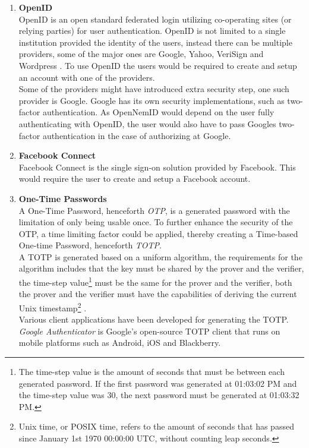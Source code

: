 \documentclass[twosided]{report}
\begin{document}
\begin{enumerate}
	\item[] \textbf{OpenID}\\
		OpenID is an open standard federated login utilizing co-operating sites (or relying parties) for user authentication. OpenID is not limited to a single institution provided the identity of the users, instead there can be multiple providers, some of the major ones are Google, Yahoo, VeriSign and Wordpress \cite{openid}. To use OpenID the users would be required to create and setup an account with one of the providers.\\
		Some of the providers might have introduced extra security step, one such provider is Google. Google has its own security implementations, such as two-factor authentication. As OpenNemID would depend on the user fully authenticating with OpenID, the user would also have to pass Googles two-factor authentication in the case of authorizing at Google.
	\item[] \textbf{Facebook Connect}\\
		Facebook Connect is the single sign-on solution provided by Facebook. This would require the user to create and setup a Facebook account. 
	\item[] \textbf{One-Time Passwords}\\
		A One-Time Password, henceforth \emph{OTP}, is a generated password with the limitation of only being usable once. To further enhance the security of the OTP, a time limiting factor could be applied, thereby creating a Time-based One-time Password, henceforth \emph{TOTP}.\\
		A TOTP is generated based on a uniform algorithm, the requirements for the algorithm includes that the key must be shared by the prover and the verifier, the time-step value\footnote{The time-step value is the amount of seconds that must be between each generated password. If the first password was generated at 01:03:02 PM and the time-step value was 30, the next password must be generated at 01:03:32 PM.} must be the same for the prover and the verifier, both the prover and the verifier must have the capabilities of deriving the current Unix timestamp\footnote{Unix time, or POSIX time, refers to the amount of seconds that has passed since January 1st 1970 00:00:00 UTC, without counting leap seconds.} \cite{rfc6238}.\\
		Various client applications have been developed for generating the TOTP. \emph{Google Authenticator} is Google's open-source TOTP client that runs on mobile platforms such as Android, iOS and Blackberry.

\end{enumerate}
\end{document}
